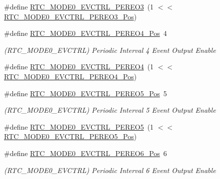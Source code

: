 \begin{DoxyCompactItemize}
\#define \mbox{\hyperlink{group___s_a_m_d21___r_t_c_ga51840a1ac7f8512a6c474ba56bc5e963}{R\+T\+C\+\_\+\+M\+O\+D\+E0\+\_\+\+E\+V\+C\+T\+R\+L\+\_\+\+P\+E\+R\+E\+O3}}~(1 $<$$<$ \mbox{\hyperlink{group___s_a_m_d21___r_t_c_ga33f7bace49d82e234204d2fff8d530f4}{R\+T\+C\+\_\+\+M\+O\+D\+E0\+\_\+\+E\+V\+C\+T\+R\+L\+\_\+\+P\+E\+R\+E\+O3\+\_\+\+Pos}})
\item 
\#define \mbox{\hyperlink{group___s_a_m_d21___r_t_c_ga56f5c240f7e4c95faef7928cb1242092}{R\+T\+C\+\_\+\+M\+O\+D\+E0\+\_\+\+E\+V\+C\+T\+R\+L\+\_\+\+P\+E\+R\+E\+O4\+\_\+\+Pos}}~4
\begin{DoxyCompactList}\small\item\em (R\+T\+C\+\_\+\+M\+O\+D\+E0\+\_\+\+E\+V\+C\+T\+RL) Periodic Interval 4 Event Output Enable \end{DoxyCompactList}\item 
\#define \mbox{\hyperlink{group___s_a_m_d21___r_t_c_gaefeb8a71ef08e4f4f3cde054760a3f03}{R\+T\+C\+\_\+\+M\+O\+D\+E0\+\_\+\+E\+V\+C\+T\+R\+L\+\_\+\+P\+E\+R\+E\+O4}}~(1 $<$$<$ \mbox{\hyperlink{group___s_a_m_d21___r_t_c_ga56f5c240f7e4c95faef7928cb1242092}{R\+T\+C\+\_\+\+M\+O\+D\+E0\+\_\+\+E\+V\+C\+T\+R\+L\+\_\+\+P\+E\+R\+E\+O4\+\_\+\+Pos}})
\item 
\#define \mbox{\hyperlink{group___s_a_m_d21___r_t_c_ga3d9834fcc2dcf5faeb40ced0789c0281}{R\+T\+C\+\_\+\+M\+O\+D\+E0\+\_\+\+E\+V\+C\+T\+R\+L\+\_\+\+P\+E\+R\+E\+O5\+\_\+\+Pos}}~5
\begin{DoxyCompactList}\small\item\em (R\+T\+C\+\_\+\+M\+O\+D\+E0\+\_\+\+E\+V\+C\+T\+RL) Periodic Interval 5 Event Output Enable \end{DoxyCompactList}\item 
\#define \mbox{\hyperlink{group___s_a_m_d21___r_t_c_ga7fda14597bc831e701276eed9583ee82}{R\+T\+C\+\_\+\+M\+O\+D\+E0\+\_\+\+E\+V\+C\+T\+R\+L\+\_\+\+P\+E\+R\+E\+O5}}~(1 $<$$<$ \mbox{\hyperlink{group___s_a_m_d21___r_t_c_ga3d9834fcc2dcf5faeb40ced0789c0281}{R\+T\+C\+\_\+\+M\+O\+D\+E0\+\_\+\+E\+V\+C\+T\+R\+L\+\_\+\+P\+E\+R\+E\+O5\+\_\+\+Pos}})
\item 
\#define \mbox{\hyperlink{group___s_a_m_d21___r_t_c_ga0bb8b8cf74711186e1993908a53154d3}{R\+T\+C\+\_\+\+M\+O\+D\+E0\+\_\+\+E\+V\+C\+T\+R\+L\+\_\+\+P\+E\+R\+E\+O6\+\_\+\+Pos}}~6
\begin{DoxyCompactList}\small\item\em (R\+T\+C\+\_\+\+M\+O\+D\+E0\+\_\+\+E\+V\+C\+T\+RL) Periodic Interval 6 Event Output Enable \end{DoxyCompactList}\item 
$$
\end{DoxyCompactItemize}
